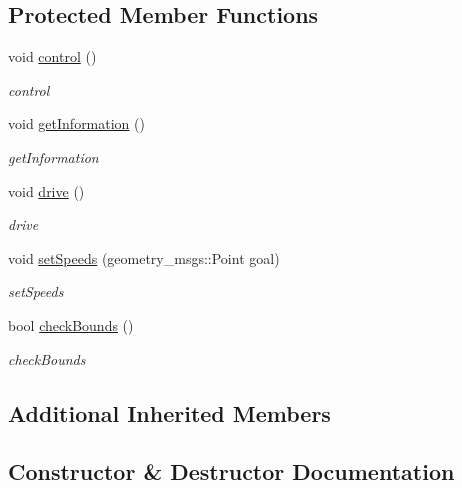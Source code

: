 \subsection*{Protected Member Functions}
\begin{DoxyCompactItemize}
\item 
void \hyperlink{classAdvPilot_a5da70d6e9d93bf585a84af786d067739}{control} ()
\begin{DoxyCompactList}\small\item\em control \end{DoxyCompactList}\item 
void \hyperlink{classAdvPilot_a1a7f8ca0d8c97120fa2c93f7e512c944}{get\+Information} ()
\begin{DoxyCompactList}\small\item\em get\+Information \end{DoxyCompactList}\item 
void \hyperlink{classAdvPilot_a06a08829ecef443f01860f48fc462c22}{drive} ()
\begin{DoxyCompactList}\small\item\em drive \end{DoxyCompactList}\item 
void \hyperlink{classAdvPilot_af5c8b68901afc6b23569f80a349d6ca8}{set\+Speeds} (geometry\+\_\+msgs\+::\+Point goal)
\begin{DoxyCompactList}\small\item\em set\+Speeds \end{DoxyCompactList}\item 
bool \hyperlink{classAdvPilot_ab765761fe28864de73c621b24b8f67cd}{check\+Bounds} ()
\begin{DoxyCompactList}\small\item\em check\+Bounds \end{DoxyCompactList}\end{DoxyCompactItemize}
\subsection*{Additional Inherited Members}


\subsection{Constructor \& Destructor Documentation}
\mbox{\label{classAdvPilot_aadb751697a17bad8e80ac26c1a05601b}} 
